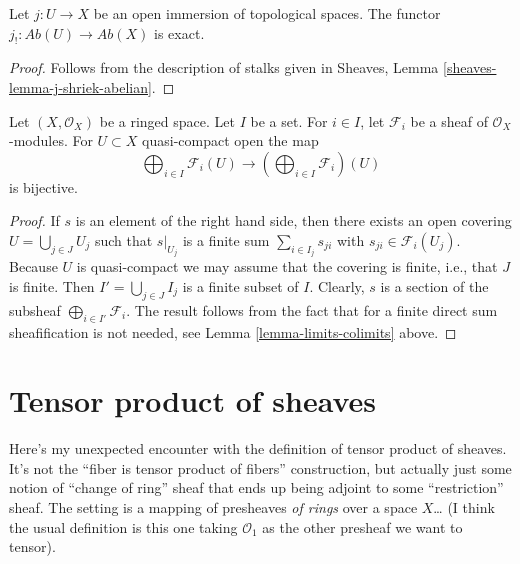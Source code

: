 \begin{lemma}
\label{lemma-j-shriek-exact}
Let $j : U \to X$ be an open immersion of topological spaces.
The functor $j_! : \textit{Ab}(U) \to \textit{Ab}(X)$
is exact.
\end{lemma}

\begin{proof}
Follows from the description of stalks
given in Sheaves, Lemma \ref{sheaves-lemma-j-shriek-abelian}.
\end{proof}

\begin{lemma}
\label{lemma-section-direct-sum-quasi-compact}
Let $(X, \mathcal{O}_X)$ be a ringed space.
Let $I$ be a set. For $i \in I$, let $\mathcal{F}_i$
be a sheaf of $\mathcal{O}_X$-modules.
For $U \subset X$ quasi-compact open the map
$$
\bigoplus\nolimits_{i \in I} \mathcal{F}_i(U)
\longrightarrow
\left(\bigoplus\nolimits_{i \in I} \mathcal{F}_i\right)(U)
$$
is bijective.
\end{lemma}

\begin{proof}
If $s$ is an element of the right hand side, then
there exists an open covering $U = \bigcup_{j \in J} U_j$
such that $s|_{U_j}$ is a finite sum
$\sum_{i \in I_j} s_{ji}$ with $s_{ji} \in \mathcal{F}_i(U_j)$.
Because $U$ is quasi-compact we may assume that the
covering is finite, i.e., that $J$ is finite.
Then $I' = \bigcup_{j \in J} I_j$ is a finite subset of
$I$. Clearly, $s$ is a section of the subsheaf
$\bigoplus_{i \in I'} \mathcal{F}_i$. The result follows
from the fact that for a finite direct sum sheafification
is not needed, see Lemma \ref{lemma-limits-colimits} above.
\end{proof}






\section{Tensor product of sheaves}
\label{section-tensor product of sheaves}

Here's my unexpected encounter with the definition of tensor product of sheaves.
It's not the ``fiber is tensor product of fibers'' construction, but actually
just some notion of ``change of ring'' sheaf that ends up being adjoint to
some ``restriction'' sheaf. The setting is a mapping of presheaves {\it of
rings} over a space $X$… (I think the usual definition is this one taking
$\mathcal{O}_1$ as the other presheaf we want to tensor).

